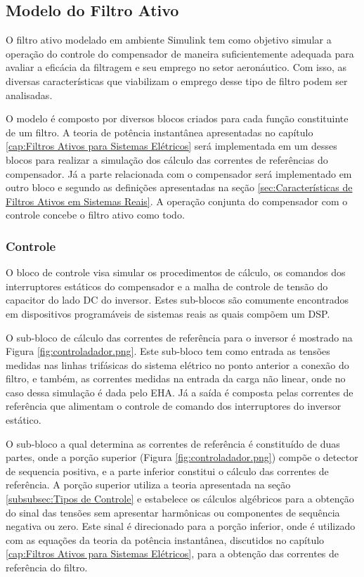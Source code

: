 
\subsection{Modelo do Filtro Ativo}

O filtro ativo modelado em ambiente Simulink tem como objetivo simular a operação do controle do compensador de maneira suficientemente adequada para avaliar a eficácia da filtragem e seu emprego no setor aeronáutico. Com isso, as diversas características que viabilizam o emprego desse tipo de filtro podem ser analisadas.

O modelo é composto por diversos blocos criados para cada função constituinte de um filtro. A teoria de potência instantânea apresentadas no capítulo \ref{cap:Filtros Ativos para Sistemas Elétricos} será implementada em um desses blocos para realizar a simulação dos cálculo das correntes de referências do compensador. Já a parte relacionada com o compensador será implementado em outro bloco e segundo as definições apresentadas na seção \ref{sec:Características de Filtros Ativos em Sistemas Reais}. A operação conjunta do compensador com o controle concebe o filtro ativo como todo.

\subsubsection{Controle}

O bloco de controle visa simular os procedimentos de cálculo, os comandos dos interruptores estáticos do compensador e a malha de controle de tensão do capacitor do lado DC do inversor. Estes sub-blocos são comumente encontrados em dispositivos programáveis de sistemas reais as quais compõem um DSP.

O sub-bloco de cálculo das correntes de referência para o inversor é mostrado na Figura \ref{fig:controladador.png}. Este sub-bloco tem como entrada as tensões medidas nas linhas trifásicas do sistema elétrico no ponto anterior a conexão do filtro, e também, as correntes medidas na entrada da carga não linear, onde no caso dessa simulação é dada pelo EHA. Já a saída é composta pelas correntes de referência que alimentam o controle de comando dos interruptores do inversor estático.

O sub-bloco a qual determina as correntes de referência é constituído de duas partes, onde a porção superior (Figura \ref{fig:controladador.png}) compõe o detector de sequencia positiva, e a parte inferior constitui o cálculo das correntes de referência. A porção superior utiliza a teoria apresentada na seção \ref{subsubsec:Tipos de Controle} e estabelece os cálculos algébricos para a obtenção do sinal das tensões sem apresentar harmônicas ou componentes de sequência negativa ou zero. Este sinal é direcionado para a porção inferior, onde é utilizado com as equações da teoria da potência instantânea, discutidos no capítulo \ref{cap:Filtros Ativos para Sistemas Elétricos}, para a obtenção das correntes de referência do filtro.

